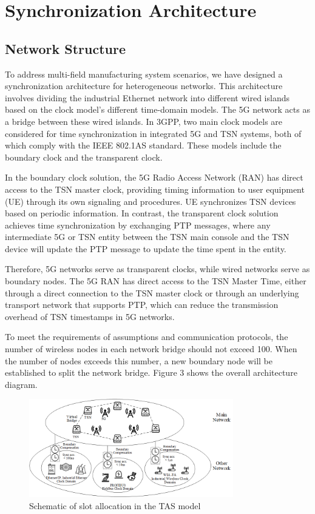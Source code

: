 \documentclass[english]{cccconf}
\begin{document}
{\section{Synchronization Architecture}
\subsection{Network Structure}
To address multi-field manufacturing system scenarios, we have designed a synchronization architecture for heterogeneous networks. This architecture involves dividing the industrial Ethernet network into different wired islands based on the clock model's different time-domain models. The 5G network acts as a bridge between these wired islands. In 3GPP, two main clock models are considered for time synchronization in integrated 5G and TSN systems, both of which comply with the IEEE 802.1AS standard. These models include the boundary clock and the transparent clock\cite{9615318}.

In the boundary clock solution, the 5G Radio Access Network (RAN) has direct access to the TSN master clock, providing timing information to user equipment (UE) through its own signaling and procedures. UE synchronizes TSN devices based on periodic information. In contrast, the transparent clock solution achieves time synchronization by exchanging PTP messages, where any intermediate 5G or TSN entity between the TSN main console and the TSN device will update the PTP message to update the time spent in the entity.

Therefore, 5G networks serve as transparent clocks, while wired networks serve as boundary nodes. The 5G RAN has direct access to the TSN Master Time, either through a direct connection to the TSN master clock or through an underlying transport network that supports PTP, which can reduce the transmission overhead of TSN timestamps in 5G networks.

To meet the requirements of assumptions and communication protocols, the number of wireless nodes in each network bridge should not exceed 100. When the number of nodes exceeds this number, a new boundary node will be established to split the network bridge. Figure 3 shows the overall architecture diagram.
\begin{figure}[htbp]
	\centering
	\setcounter{figure}{3}
	\includegraphics[width=3.5in]{fig17.png}
	\caption{Schematic of slot allocation in the TAS model}
\end{figure}
}
\end{document}
